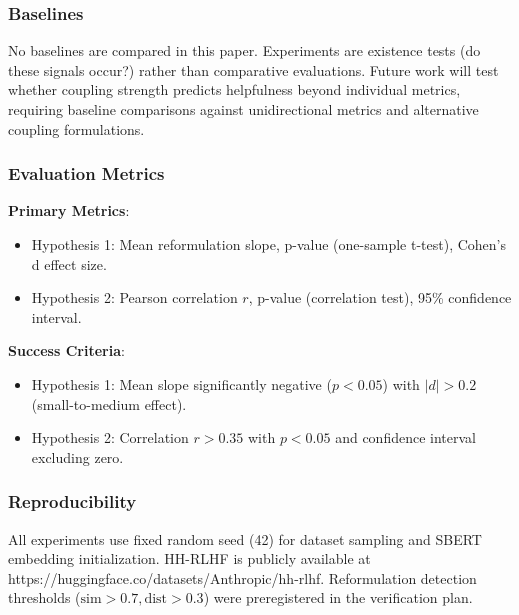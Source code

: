 \subsubsection{Baselines}

No baselines are compared in this paper. Experiments are existence tests (do these signals occur?) rather than comparative evaluations. Future work will test whether coupling strength predicts helpfulness beyond individual metrics, requiring baseline comparisons against unidirectional metrics and alternative coupling formulations.

\subsubsection{Evaluation Metrics}

\textbf{Primary Metrics}:
\begin{itemize}
\item Hypothesis 1: Mean reformulation slope, p-value (one-sample t-test), Cohen's d effect size.
\item Hypothesis 2: Pearson correlation $r$, p-value (correlation test), 95\% confidence interval.
\end{itemize}

\textbf{Success Criteria}:
\begin{itemize}
\item Hypothesis 1: Mean slope significantly negative ($p < 0.05$) with $|d| > 0.2$ (small-to-medium effect).
\item Hypothesis 2: Correlation $r > 0.35$ with $p < 0.05$ and confidence interval excluding zero.
\end{itemize}

\subsubsection{Reproducibility}

All experiments use fixed random seed (42) for dataset sampling and SBERT embedding initialization. HH-RLHF is publicly available at https://huggingface.co/datasets/Anthropic/hh-rlhf. Reformulation detection thresholds ($\text{sim} > 0.7, \text{dist} > 0.3$) were preregistered in the verification plan.
